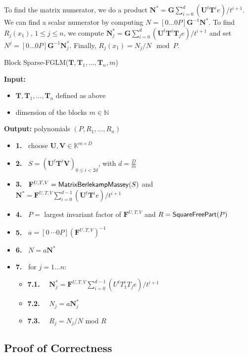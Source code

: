 \documentclass[12pt]{article}
\def\mF{\mathbf{F}}
\def\mG{\mathbf{G}}
\def\mN{\mathbf{N}}
\def\mT{\mathbf{T}}
\def\mU{\mathbf{U}}
\def\mV{\mathbf{V}}
\begin{document}
To find the matrix numerator, we do a product 
$\mN^* = \mG\sum_{i=0}^{d} (\mU^t \mT^i e)/ t^{i+1}$. We can find a
scalar numerator by computing $N =  [0 \dots 0 P] \mG^{-1} \mN^*$. To find $R_j(x_1)$, $1 \le j \le n$,
we compute 
$\mN^*_j = \mG \sum_{i=0}^{d} (\mU^t \mT^i \mT_j e) / {t^{i+1}}$
and set $N^j =
[0 \dots 0 P] \mG^{-1} \mN^*_j$. Finally, $R_j(x_1) = N_j / N \mod P$.

\begin{algorithm}[H]
	\label{algo:block-sparse-fglm}
	\caption{Block Sparse-FGLM($\mT,\mT_1,\dots,\mT_n,m$)}
	{\bf Input:} \vspace{-0.5em}
	\begin{itemize}
		\item $\mT,\mT_1,\dots,\mT_n$ defined as above
		\item dimension of the blocks $m \in \mathbb{N}$
	\end{itemize}
	{\bf Output:} polynomials $(P,R_1,\dots,R_n)$
	\begin{itemize}\setlength\itemsep{0em}
		\item[]{\bf 1.~} {\sf choose $\mU,\mV \in \mathbb{K}^{m \times D}$}
		\item[]{\bf 2.~} {\sf $S= (\mU^t\mT^i\mV)_{0 \le i < 2d}$, with $d = \frac{D}{m}$}
		\item[]{\bf 3.~} {\sf $\mF^{U,T,V} = {\sf MatrixBerlekampMassey}(S)$ and 
		$\mN^* = \mF^{U,T,V}\sum_{i=0}^{d-1} {(\mU^t\mT^ie)}/{t^{i+1}}$}
		\item[]{\bf 4.~} {\sf $P=$ largest invariant factor of $\mF^{U,T,V}$ 
		and $R={\sf SquareFreePart}(P)$}
		\item[]{\bf 5.~} {\sf $a = [0 ~\cdots 0 P] (\mF^{U,T,V})^{-1}$}
		\item[]{\bf 6.~} {\sf $N=a\mN^*$}
		\item[]{\bf 7.~} {\sf for $j = 1 \dots n$:}
		\begin{itemize}
			\item[]{\bf 7.1.} ~~{\sf	$\mN_j^* = \mF^{U,T,V}
				\sum_{i= 0}^{d-1} {(U^tT_1^i T_j e)}/{t^{i+1}}$}
			\item[]{\bf 7.2.} ~~{\sf $N_j=a\mN_j^*$}
			\item[]{\bf 7.3.} ~~{\sf $R_j=N_j/N$ mod $R$}
		\end{itemize}
	\end{itemize}
\end{algorithm}

\subsection{Proof of Correctness}
\end{document}
